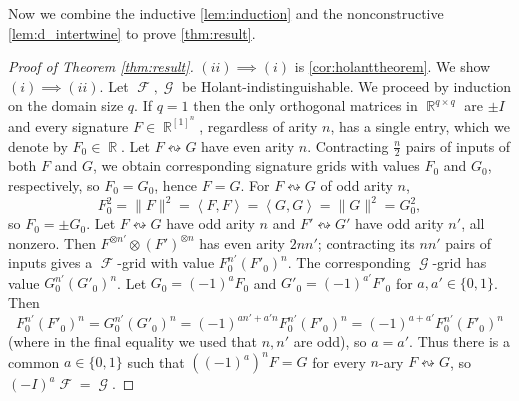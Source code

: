 \documentclass{theoretics}
\DeclareMathOperator{\rr}{\mathbb{R}}
\DeclareMathOperator{\fc}{\mathcal{F}}
\DeclareMathOperator{\gc}{\mathcal{G}}
\begin{document}
Now we combine the inductive \autoref{lem:induction} and the nonconstructive 
\autoref{lem:d_intertwine} to prove \autoref{thm:result}.
\begin{proof}[Proof of Theorem \ref{thm:result}]
    $(ii) \implies (i)$ is \autoref{cor:holanttheorem}.
    We show $(i) \implies (ii)$. Let $\fc,\gc$ be Holant-indistinguishable.
    We proceed by induction on the domain size $q$. If $q = 1$ then the only orthogonal matrices
    in $\rr^{q \times q}$ are $\pm I$ and every signature $F \in \rr^{[1]^n}$, regardless of arity $n$, 
    has a single entry, which we denote by $F_0 \in \rr$. Let $F \leftrightsquigarrow G$ have
    even arity $n$. Contracting $\frac{n}{2}$ pairs of inputs of both $F$ and $G$, 
    we obtain corresponding signature grids with values $F_0$ and $G_0$, respectively, so $F_0 = G_0$, hence
    $F = G$. For $F \leftrightsquigarrow G$ of odd arity $n$, 
    \[
        F_0^2 = \|F\|^2 = \left\langle F,F\right\rangle = \left\langle G,G\right\rangle = \|G\|^2 = G_0^2,
    \]
    so $F_0 = \pm G_0$. Let $F \leftrightsquigarrow G$ have odd arity $n$
    and $F' \leftrightsquigarrow G'$ have odd arity $n'$, all nonzero. Then
    $F^{\otimes n'} \otimes (F')^{\otimes n}$
    has even arity $2nn'$; contracting its $nn'$ pairs of inputs gives a $\fc$-grid
    with value $F_0^{n'}(F'_0)^n$. The corresponding $\gc$-grid has value
    $G_0^{n'}(G'_0)^n$. Let $G_0 = (-1)^aF_0$ and $G'_0 = (-1)^{a'} F'_0$ for $a,a'\in \{0,1\}$. Then
    \[
        F_0^{n'} (F'_0)^n = G_0^{n'}(G'_0)^n = (-1)^{an' + a'n}F_0^{n'}(F'_0)^n
        = (-1)^{a + a'}F_0^{n'}(F'_0)^n
    \]
    (where in the final equality we used that $n,n'$ are odd), so $a = a'$. Thus there is a common
    $a \in \{0,1\}$ such that $((-1)^a)^n F = G$ for every $n$-ary $F \leftrightsquigarrow G$,
    so $(-I)^a \fc = \gc$.


\end{proof}
\end{document}
